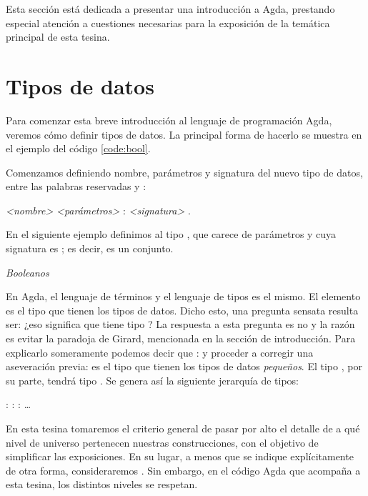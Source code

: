 Esta sección está dedicada a presentar una introducción a Agda, prestando especial atención a cuestiones necesarias para la exposición de la temática principal de esta tesina. 
\newpage

\section{Tipos de datos}\label{agda:data}

Para comenzar esta breve introducción al lenguaje de programación Agda, veremos cómo definir tipos de datos. La principal forma de hacerlo se muestra en el ejemplo del código \ref{code:bool}.

Comenzamos definiendo nombre, parámetros y signatura del nuevo tipo de datos, entre las palabras reservadas  y :

 {\it <nombre>} {\it <parámetros>} : {\it <signatura>} .

En el siguiente ejemplo definimos al tipo , que carece de parámetros y cuya signatura es ; es decir, es un conjunto.

\begin{agdacode}{\it Booleanos}\label{code:bool}
  
\end{agdacode}

En Agda, el lenguaje de términos y el lenguaje de tipos es el mismo. El elemento  es el tipo que tienen los tipos de datos. Dicho esto, una pregunta sensata resulta ser: ¿eso significa que  tiene tipo ? La respuesta a esta pregunta es no
y la razón es evitar la paradoja de Girard, mencionada en la sección de introducción.
Para explicarlo someramente podemos decir que  :  y proceder a corregir una aseveración previa:  es el tipo que tienen los tipos de datos {\it pequeños}. El tipo , por su parte, tendrá tipo . Se genera así la siguiente jerarquía de tipos:

\sangrar
{} :  :  :  \ldots

En esta tesina tomaremos el criterio general de pasar por alto el detalle de a qué nivel de universo pertenecen nuestras construcciones, con el objetivo de simplificar las exposiciones. En su lugar, a menos que se indique explícitamente de otra forma, consideraremos . Sin embargo, en el código Agda que acompaña a esta tesina, los distintos niveles se respetan.

